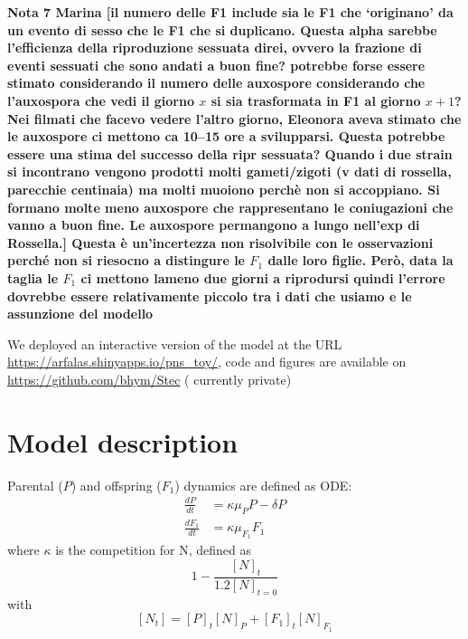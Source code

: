 \documentclass[a4paper,oneside]{article}
\begin{document}
    {\color{red}\textbf{Nota 7 Marina
    {\color{blue}[il numero delle F1 include sia le F1 che `originano' da un evento di sesso che le F1 che si duplicano. Questa alpha sarebbe l'efficienza della riproduzione sessuata direi, ovvero la frazione di eventi sessuati che sono andati a buon fine? potrebbe forse essere stimato considerando il numero delle auxospore considerando che l'auxospora che vedi il giorno $x$ si sia trasformata in F1 al giorno $x+1$? Nei filmati che facevo vedere l'altro giorno, Eleonora aveva stimato che le auxospore ci mettono ca 10--15 ore a svilupparsi. Questa potrebbe essere una stima del successo della ripr sessuata? Quando i due strain si incontrano vengono prodotti molti gameti/zigoti (v dati di rossella, parecchie centinaia) ma molti muoiono perch{\`e} non si accoppiano. Si formano molte meno auxospore che rappresentano le coniugazioni che vanno a buon fine. Le auxospore permangono a lungo nell'exp di Rossella.]}
    Questa {\`e} un'incertezza non risolvibile con le osservazioni perch{\'e} non si riesocno a distingure le $F_1$ dalle loro figlie. Per{\`o}, data la taglia le $F_1$ ci mettono lameno due giorni a riprodursi quindi l'errore dovrebbe essere relativamente piccolo tra i dati che usiamo e le assunzione del modello}
    }

    We deployed an interactive version of the model at the URL \url{https://arfalas.shinyapps.io/pns_toy/}, code and figures are available on \url{https://github.com/bhym/Stec} ({\color{red} currently private})
%
  \section*{Model description}
    Parental ($P$) and offspring ($F_{1}$) dynamics are defined as ODE:\@
    \begin{align}
      \frac{dP}{dt}     &= \kappa \mu_{P} P - \delta P \\
      \frac{dF_{1}}{dt} &= \kappa \mu_{F_{1}} F_{1}
    \end{align}
    where $\kappa$ is the competition for N, defined as
    \[
      1 - \frac{{[N]}_{t}}{1.2{[N]}_{t=0}}
    \]
    with 
    \[
      [N_{t}] = {[P]}_{t} {[N]}_{P} + {[F_{1}]}_{t} {[N]}_{F_{1}}
    \]
\end{document}
